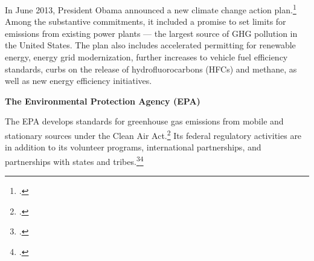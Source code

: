 In June 2013, President Obama announced a new climate change action plan.\footcite[][]{ObamaJune2013}
Among the substantive commitments, it included a promise to set limits for  emissions from existing power plants --- the largest source of GHG pollution in the United States.
The plan also includes accelerated permitting for renewable energy, energy grid modernization, further increases to vehicle fuel efficiency standards, curbs on the release of hydrofluorocarbons (HFCs) and methane, as well as new energy efficiency initiatives.



\textbf{The Environmental Protection Agency (EPA)}



The EPA develops standards for greenhouse gas emissions from mobile and stationary sources under the Clean Air Act.\footcite[][]{EPAAirEnforcement} Its federal regulatory activities are in addition to its volunteer programs, international partnerships, and partnerships with states and tribes.\footcite[][]{EPAVolunteer}\footcite[][]{EPAInternational}

